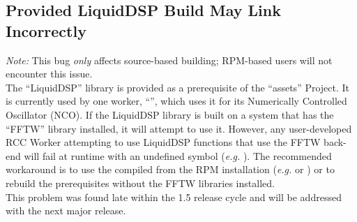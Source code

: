 \subsection{Provided LiquidDSP Build May Link Incorrectly} %
\label{bug:5543}
\textit{Note:} This bug \textit{only} affects source-based building; RPM-based users will not encounter this issue.\\

The ``LiquidDSP'' library is provided as a prerequisite of the ``assets'' Project.
It is currently used by one worker, ``'', which uses it for its Numerically Controlled Oscillator (NCO).
If the LiquidDSP library is built on a system that has the ``FFTW'' library installed, it will attempt to use it.
However, any user-developed RCC Worker attempting to use LiquidDSP functions that use the FFTW back-end will fail at runtime with an undefined symbol (\textit{e.g.} ).
The recommended workaround is to use the compiled  from the RPM installation (\textit{e.g.}  or ) or to rebuild the prerequisites without the FFTW libraries installed.\\

This problem was found late within the 1.5 release cycle and will be addressed with the next major release.

